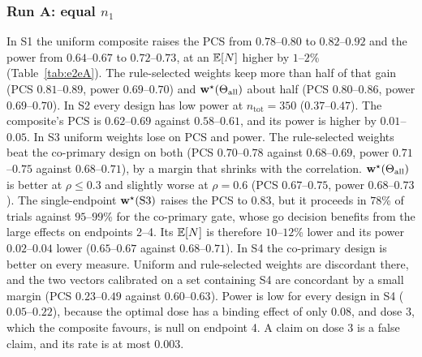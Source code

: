 \begin{table}
\centering\footnotesize
\caption{Run A in the alternative configurations ($n_1=100$): PCS, power and expected total sample size.}\label{tab:e2eA}

\end{table}

\subsubsection{Run A: equal \texorpdfstring{$n_1$}{n1}}
In S1 the uniform composite raises the PCS from $0.78$--$0.80$ to $0.82$--$0.92$ and the power from $0.64$--$0.67$ to $0.72$--$0.73$, at an $\mathbb{E}[N]$ higher by $1$--$2$\% (Table~\ref{tab:e2eA}). The rule-selected weights keep more than half of that gain (PCS $0.81$--$0.89$, power $0.69$--$0.70$) and $\mathbf{w}^\star(\Theta_{\mathrm{all}})$ about half (PCS $0.80$--$0.86$, power $0.69$--$0.70$). In S2 every design has low power at $n_{\mathrm{tot}}=350$ ($0.37$--$0.47$). The composite's PCS is $0.62$--$0.69$ against $0.58$--$0.61$, and its power is higher by $0.01$--$0.05$. In S3 uniform weights lose on PCS and power. The rule-selected weights beat the co-primary design on both (PCS $0.70$--$0.78$ against $0.68$--$0.69$, power $0.71$--$0.75$ against $0.68$--$0.71$), by a margin that shrinks with the correlation. $\mathbf{w}^\star(\Theta_{\mathrm{all}})$ is better at $\rho\le0.3$ and slightly worse at $\rho=0.6$ (PCS $0.67$--$0.75$, power $0.68$--$0.73$). The single-endpoint $\mathbf{w}^\star(\mathrm{S3})$ raises the PCS to $0.83$, but it proceeds in $78$\% of trials against $95$--$99$\% for the co-primary gate, whose go decision benefits from the large effects on endpoints 2--4. Its $\mathbb{E}[N]$ is therefore $10$--$12$\% lower and its power $0.02$--$0.04$ lower ($0.65$--$0.67$ against $0.68$--$0.71$). In S4 the co-primary design is better on every measure. Uniform and rule-selected weights are discordant there, and the two vectors calibrated on a set containing S4 are concordant by a small margin (PCS $0.23$--$0.49$ against $0.60$--$0.63$). Power is low for every design in S4 ($0.05$--$0.22$), because the optimal dose has a binding effect of only $0.08$, and dose 3, which the composite favours, is null on endpoint 4. A claim on dose 3 is a false claim, and its rate is at most $0.003$.

